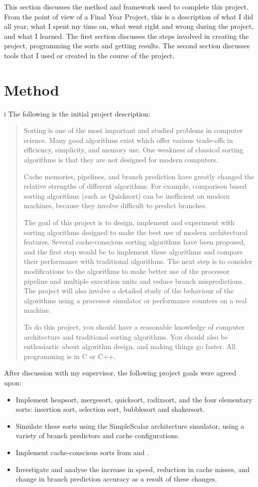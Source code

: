 \label{method}
This section discusses the method and framework used to complete this project.
From the point of view of a Final Year Project, this is a description of what I
did all year, what I spent my time on, what went right and wrong during the
project, and what I learned. The first section discusses the steps involved in
creating the project, programming the sorts and getting results. The second
section discusses tools that I used or created in the course of the project.

\section{Method}
i
The following is the initial project description:
\begin{quotation}
Sorting is one of the most important and studied problems in computer science.
Many good algorithms exist which offer various trade-offs in efficiency,
simplicity, and memory use.  One weakness of classical sorting algorithms is
that they are not designed for modern computers.

Cache memories, pipelines, and branch prediction have greatly changed the
relative strengths of different algorithms. For example, comparison based
sorting algorithms (such as Quicksort) can be inefficient on modern machines,
because they involve difficult to predict branches.

The goal of this project is to design, implement and experiment with sorting
algorithms designed to make the best use of modern architectural features.
Several cache-conscious sorting algorithms have been proposed, and the first
step would be to implement these algorithms and compare their performance with
traditional algorithms.  The next step is to consider modifications to the
algorithms to make better use of the processor pipeline and multiple execution
units and reduce branch mispredictions. The project will also involve a detailed
study of the behaviour of the algorithms using a processor simulator or
performance counters on a real machine.

To do this project, you should have a reasonable knowledge of computer
architecture and traditional sorting algorithms. You should also be enthusiastic
about algorithm design, and making things go faster.  All programming is in C or
C++.
\end{quotation}
After discussion with my supervisor, the following project goals were agreed upon:
\begin{itemize}
\item Implement heapsort, mergesort, quicksort, radixsort, and the four
elementary sorts: insertion sort, selection sort, bubblesort and shakersort.
\item Simulate these sorts using the SimpleScalar architecture simulator, using a
variety of branch predictors and cache configurations.
\item Implement cache-conscious sorts from \cite{LaMarca96} and
\cite{LaMarca99}.
\item Investigate and analyse the increase in speed, reduction in cache misses, 
and change in branch prediction accuracy as a result of these changes.
\end{itemize}

